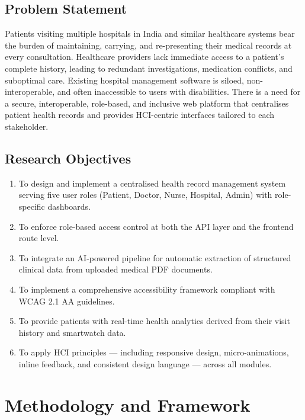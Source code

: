 \documentclass[12pt,a4paper]{report}
\begin{document}
\section{Problem Statement}

Patients visiting multiple hospitals in India and similar healthcare systems bear the burden of maintaining, carrying, and re-presenting their medical records at every consultation. Healthcare providers lack immediate access to a patient's complete history, leading to redundant investigations, medication conflicts, and suboptimal care. Existing hospital management software is siloed, non-interoperable, and often inaccessible to users with disabilities. There is a need for a secure, interoperable, role-based, and inclusive web platform that centralises patient health records and provides HCI-centric interfaces tailored to each stakeholder.

\section{Research Objectives}

\begin{enumerate}[leftmargin=2cm]
    \item To design and implement a centralised health record management system serving five user roles (Patient, Doctor, Nurse, Hospital, Admin) with role-specific dashboards.
    \item To enforce role-based access control at both the API layer and the frontend route level.
    \item To integrate an AI-powered pipeline for automatic extraction of structured clinical data from uploaded medical PDF documents.
    \item To implement a comprehensive accessibility framework compliant with WCAG 2.1 AA guidelines.
    \item To provide patients with real-time health analytics derived from their visit history and smartwatch data.
    \item To apply HCI principles — including responsive design, micro-animations, inline feedback, and consistent design language — across all modules.
\end{enumerate}

\chapter{Methodology and Framework}
\end{document}
